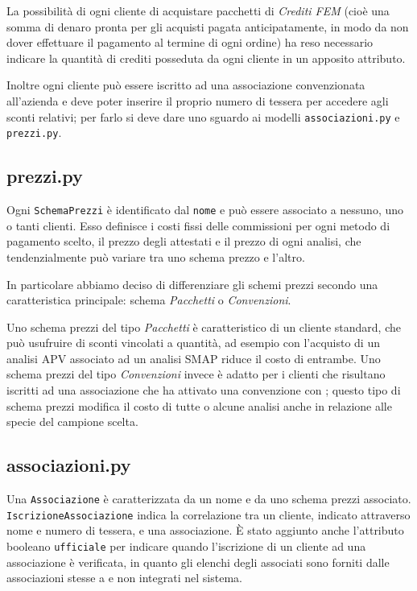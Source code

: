 La possibilità di ogni cliente di acquistare pacchetti di \emph{Crediti FEM} (cioè una somma di denaro pronta per gli acquisti pagata anticipatamente, in modo da non dover effettuare il pagamento al termine di ogni ordine) ha reso necessario indicare la quantità di crediti posseduta da ogni cliente in un apposito attributo.

Inoltre ogni cliente può essere iscritto ad una associazione convenzionata all'azienda {\fem} e deve poter inserire il proprio numero di tessera per accedere agli sconti relativi; per farlo si deve dare uno sguardo ai modelli \texttt{associazioni.py} e \texttt{prezzi.py}.

\subsection*{prezzi.py}
\label{subs:prezzi}
Ogni \texttt{SchemaPrezzi} è identificato dal \texttt{nome} e può essere associato a nessuno, uno o tanti clienti. Esso definisce i costi fissi delle commissioni per ogni metodo di pagamento scelto, il prezzo degli attestati e il prezzo di ogni analisi, che tendenzialmente può variare tra uno schema prezzo e l'altro.

In particolare abbiamo deciso di differenziare gli schemi prezzi secondo una caratteristica principale: schema \emph{Pacchetti} o \emph{Convenzioni}.

Uno schema prezzi del tipo \emph{Pacchetti} è caratteristico di un cliente standard, che può usufruire di sconti vincolati a quantità, ad esempio con l'acquisto di un analisi APV associato ad un analisi SMAP riduce il costo di entrambe. Uno schema prezzi del tipo \emph{Convenzioni} invece è adatto per i clienti che risultano iscritti ad una associazione che ha attivato una convenzione con {\fem}; questo tipo di schema prezzi modifica il costo di tutte o alcune analisi anche in relazione alle specie del campione scelta.

\subsection*{associazioni.py}
\label{subs:associazioni}
Una \texttt{Associazione} è caratterizzata da un nome e da uno schema prezzi associato. \texttt{IscrizioneAssociazione} indica la correlazione tra un cliente, indicato attraverso nome e numero di tessera, e una associazione. È stato aggiunto anche l'attributo booleano \texttt{ufficiale} per indicare quando l'iscrizione di un cliente ad una associazione è verificata, in quanto gli elenchi degli associati sono forniti dalle associazioni stesse a {\fem} e non integrati nel sistema.

